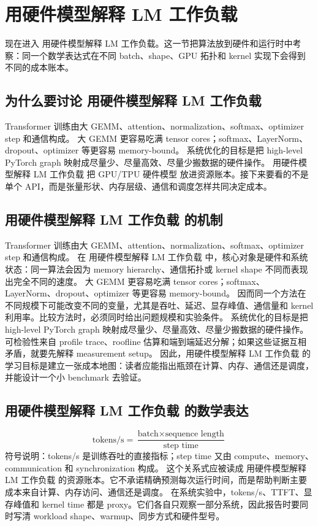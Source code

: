 \documentclass[a4paper]{article}
\begin{document}
\section{用硬件模型解释 LM 工作负载}
现在进入 用硬件模型解释 LM 工作负载。这一节把算法放到硬件和运行时中考察：同一个数学表达式在不同 batch、shape、GPU 拓扑和 kernel 实现下会得到不同的成本账本。
\subsection{为什么要讨论 用硬件模型解释 LM 工作负载}
Transformer 训练由大 GEMM、attention、normalization、softmax、optimizer step 和通信构成。
大 GEMM 更容易吃满 tensor cores；softmax、LayerNorm、dropout、optimizer 等更容易 memory-bound。
系统优化的目标是把 high-level PyTorch graph 映射成尽量少、尽量高效、尽量少搬数据的硬件操作。
用硬件模型解释 LM 工作负载 把 GPU/TPU 硬件模型 放进资源账本。接下来要看的不是单个 API，而是张量形状、内存层级、通信和调度怎样共同决定成本。
\subsection{用硬件模型解释 LM 工作负载 的机制}
Transformer 训练由大 GEMM、attention、normalization、softmax、optimizer step 和通信构成。 在 用硬件模型解释 LM 工作负载 中，核心对象是硬件和系统状态：同一算法会因为 memory hierarchy、通信拓扑或 kernel shape 不同而表现出完全不同的速度。
大 GEMM 更容易吃满 tensor cores；softmax、LayerNorm、dropout、optimizer 等更容易 memory-bound。 因而同一个方法在不同规模下可能改变不同的变量，尤其是吞吐、延迟、显存峰值、通信量和 kernel 利用率。比较方法时，必须同时给出问题规模和实验条件。
系统优化的目标是把 high-level PyTorch graph 映射成尽量少、尽量高效、尽量少搬数据的硬件操作。 可检验性来自 profile trace、roofline 估算和端到端延迟分解；如果这些证据互相矛盾，就要先解释 measurement setup。
因此，用硬件模型解释 LM 工作负载 的学习目标是建立一张成本地图：读者应能指出瓶颈在计算、内存、通信还是调度，并能设计一个小 benchmark 去验证。
\subsection{用硬件模型解释 LM 工作负载 的数学表达}
\[\text{tokens/s}=\frac{\text{batch}\times\text{sequence length}}{\text{step time}}\]
符号说明：tokens/s 是训练吞吐的直接指标；step time 又由 compute、memory、communication 和 synchronization 构成。
这个关系式应被读成 用硬件模型解释 LM 工作负载 的资源账本。它不承诺精确预测每次运行时间，而是帮助判断主要成本来自计算、内存访问、通信还是调度。
在系统实验中，tokens/s、TTFT、显存峰值和 kernel time 都是 proxy。它们各自只观察一部分系统，因此报告时要同时写清 workload shape、warmup、同步方式和硬件型号。
\end{document}
